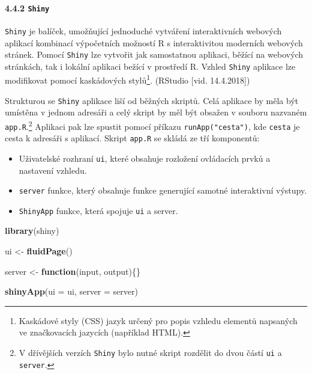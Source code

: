\documentclass[12pt,]{article}
\newenvironment{Shaded}{\begin{snugshade}}{\end{snugshade}}
\newcommand{\KeywordTok}[1]{\textcolor[rgb]{0.13,0.29,0.53}{\textbf{#1}}}
\newcommand{\DataTypeTok}[1]{\textcolor[rgb]{0.13,0.29,0.53}{#1}}
\newcommand{\StringTok}[1]{\textcolor[rgb]{0.31,0.60,0.02}{#1}}
\newcommand{\ControlFlowTok}[1]{\textcolor[rgb]{0.13,0.29,0.53}{\textbf{#1}}}
\newcommand{\NormalTok}[1]{#1}
\providecommand{\tightlist}{%
  \setlength{\itemsep}{0pt}\setlength{\parskip}{0pt}}
\let\oldparagraph\paragraph
\renewcommand{\paragraph}[1]{\oldparagraph{#1}\mbox{}}
\let\rmarkdownfootnote\footnote%
\def\footnote{\protect\rmarkdownfootnote}
\begin{document}
\hypertarget{shiny}{\paragraph{\texorpdfstring{4.4.2
\texttt{Shiny}}{4.4.2 Shiny}}\label{shiny}}

\qquad \texttt{Shiny} je balíček, umožňující jednoduché vytváření
interaktivních webových aplikací kombinací výpočetních možností R s
interaktivitou moderních webových stránek. Pomocí \texttt{Shiny} lze
vytvořit jak samostatnou aplikaci, běžící na webových stránkách, tak i
lokální aplikaci bežící v prostředí R. Vzhled \texttt{Shiny} aplikace
lze modifikovat pomocí kaskádových stylů\footnote{Kaskádové styly (CSS)
  jazyk určený pro popis vzhledu elementů napsaných ve značkovacích
  jazycích (například HTML).}. (RStudio {[}vid. 14.4.2018{]})

\qquad Strukturou se \texttt{Shiny} aplikace liší od běžných skriptů.
Celá aplikace by měla být umístěna v jednom adresáři a celý skript by
měl být obsažen v souboru nazvaném \texttt{app.R}.\footnote{V dřívějších
  verzích \texttt{Shiny} bylo nutné skript rozdělit do dvou částí
  \texttt{ui} a \texttt{server}.} Aplikaci pak lze spustit pomocí
příkazu \texttt{runApp("cesta")}, kde \texttt{cesta} je cesta k adresáři
s aplikací. Skript \texttt{app.R} se skládá ze tří komponentů:

\begin{itemize}
\tightlist
\item
  Uživatelské rozhraní \texttt{ui}, které obsahuje rozložení ovládacích
  prvků a nastavení vzhledu.
\item
  \texttt{server} funkce, který obsahuje funkce generující samotné
  interaktivní výstupy.
\item
  \texttt{ShinyApp} funkce, která spojuje \texttt{ui} a server. \newline
\end{itemize}

\begin{Shaded}
\begin{Highlighting}[]
\KeywordTok{library}\NormalTok{(shiny)}

\NormalTok{ui <-}\StringTok{ }\KeywordTok{fluidPage}\NormalTok{()}

\NormalTok{server <-}\StringTok{ }\ControlFlowTok{function}\NormalTok{(input, output)\{\}}

\KeywordTok{shinyApp}\NormalTok{(}\DataTypeTok{ui =}\NormalTok{ ui, }\DataTypeTok{server =}\NormalTok{ server)}
\end{Highlighting}
\end{Shaded}
\end{document}
